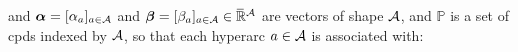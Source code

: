 \documentclass[twoside]{article}
\newcommand\vjoe[1]{{\color{joecolor}\textbf{$\boldsymbol\{$Joe: }#1 \textbf{$\boldsymbol\}$}}}
\begin{document}
\begin{defn}
    and
     $\boldsymbol\alpha = [\alpha_a]_{a \in \mathcal A}$ and $\boldsymbol\beta = [\beta_a]_{a \in \mathcal A} \in \mskip1mu\overline{\mskip-1mu\mathbb R\!}\,^\mathcal A$
    are vectors of shape $\mathcal A$,
    and $\mathbb P$ is a set of cpds indexed by $\mathcal A$,
    so that each hyperarc
    $a \in \mathcal A$ is associated with:
    

\end{defn}
\end{document}
